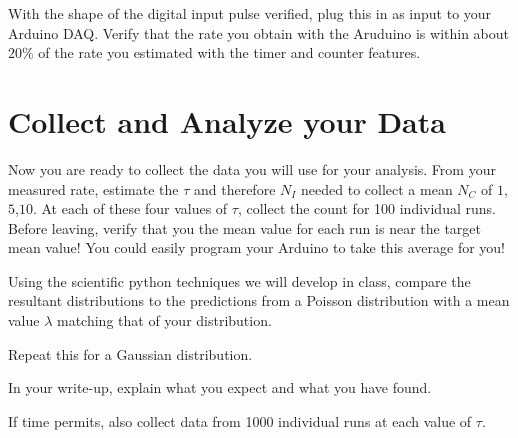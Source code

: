 \documentclass[12pt]{article}
\begin{document}
With the shape of the digital input pulse verified, plug this in as input to your Arduino DAQ.  Verify that the rate you obtain with the Aruduino is within about $20\%$ of the rate you estimated with the timer and counter features.
 

\section{Collect and Analyze your Data}

Now you are ready to collect the data you will use for your analysis.  From your measured rate, estimate the $\tau$ and therefore $N_I$ needed to collect a mean $N_C$ of $1$,$5$,$10$.  At each of these four values of $\tau$, collect the count for 100 individual runs.  Before leaving, verify that you the mean value for each run is near the target mean value!  You could easily program your Arduino to take this average for you!

Using the scientific python techniques we will develop in class, compare the resultant distributions to the predictions from a Poisson distribution with a mean value $\lambda$ matching that of your distribution.

Repeat this for a Gaussian distribution.

In your write-up, explain what you expect and what you have found.

If time permits, also collect data from 1000 individual runs at each value of $\tau$.
\end{document}
